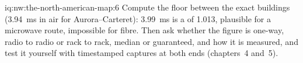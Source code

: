 \begin{solution}{iq:nw:the-north-american-map:6}
Compute the floor between the exact buildings (\qty{3.94}{\milli\second} in air for Aurora--Carteret): \qty{3.99}{\milli\second} is a  of 1.013, plausible for a microwave route, impossible for fibre. Then ask whether the figure is one-way, radio to radio or rack to rack,
median or guaranteed, and how it is measured, and test it yourself with timestamped captures at both ends (chapters~4 and~5).
\end{solution}
